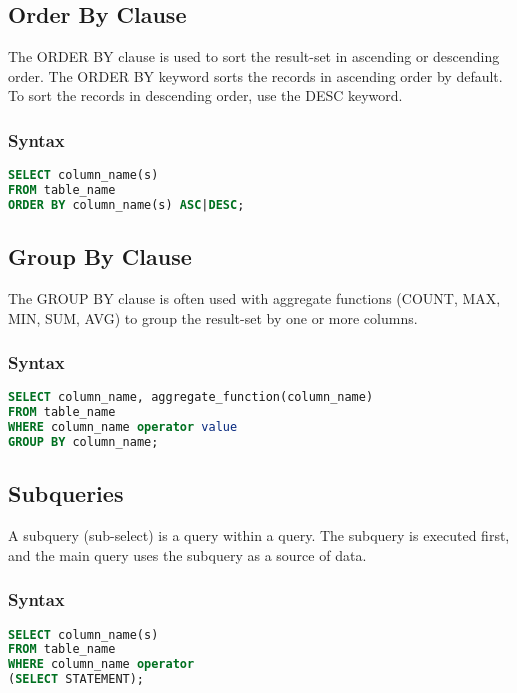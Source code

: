 \documentclass[11pt]{article}
\begin{document}
\subsection{Order By Clause}

The ORDER BY clause is used to sort the result-set in ascending or descending order. The ORDER BY keyword sorts the records in ascending order by default. To sort the records in descending order, use the DESC keyword.

\subsubsection*{Syntax}

\begin{lstlisting}[language=sql]
SELECT column_name(s)
FROM table_name
ORDER BY column_name(s) ASC|DESC;
\end{lstlisting}

\subsection{Group By Clause}

The GROUP BY clause is often used with aggregate functions (COUNT, MAX, MIN, SUM, AVG) to group the result-set by one or more columns.

\subsubsection*{Syntax}

\begin{lstlisting}[language=sql]
SELECT column_name, aggregate_function(column_name)
FROM table_name
WHERE column_name operator value
GROUP BY column_name;
\end{lstlisting}

\subsection{Subqueries}

A subquery (sub-select) is a query within a query. The subquery is executed first, and the main query uses the subquery as a source of data.

\subsubsection*{Syntax}

\begin{lstlisting}[language=sql]
SELECT column_name(s)
FROM table_name
WHERE column_name operator
(SELECT STATEMENT);
\end{lstlisting}
\end{document}
